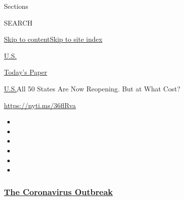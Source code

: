 Sections

SEARCH

\protect\hyperlink{site-content}{Skip to
content}\protect\hyperlink{site-index}{Skip to site index}

\href{https://www.nytimes3xbfgragh.onion/section/us}{U.S.}

\href{https://myaccount.nytimes3xbfgragh.onion/auth/login?response_type=cookie\&client_id=vi}{}

\href{https://www.nytimes3xbfgragh.onion/section/todayspaper}{Today's
Paper}

\href{/section/us}{U.S.}\textbar{}All 50 States Are Now Reopening. But
at What Cost?

\url{https://nyti.ms/36flRva}

\begin{itemize}
\item
\item
\item
\item
\item
\item
\end{itemize}

\hypertarget{the-coronavirus-outbreak}{%
\subsubsection{\texorpdfstring{\href{https://www.nytimes3xbfgragh.onion/news-event/coronavirus?name=styln-coronavirus-national\&region=TOP_BANNER\&variant=undefined\&block=storyline_menu_recirc\&action=click\&pgtype=Article\&impression_id=1b5d27a0-e39a-11ea-ad89-c1522ca3443c}{The
Coronavirus
Outbreak}}{The Coronavirus Outbreak}}\label{the-coronavirus-outbreak}}

